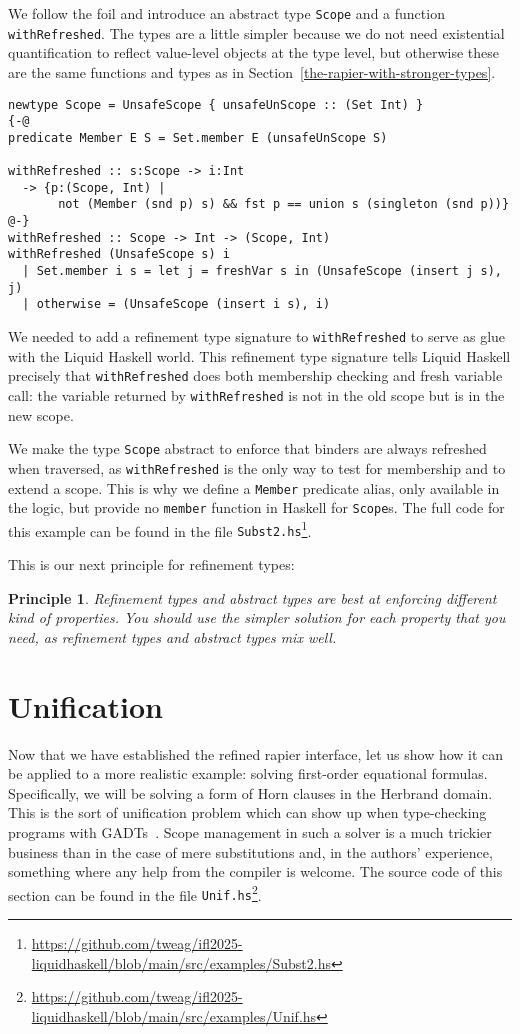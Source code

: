 \documentclass[sigconf]{acmart}
\newcommand{\tc}[1]{{\small\texttt{#1}}}
\newcommand{\sourcefile}[1]{\tc{#1}\footnote{\scriptsize\url{https://github.com/tweag/ifl2025-liquidhaskell/blob/main/src/examples/#1}}}
\newtheorem{principle}{Principle}
\begin{document}
We follow the foil and
introduce an abstract type \tc{Scope} and a function \tc{withRefreshed}. The types are a little
simpler because we do not need existential quantification to reflect value-level
objects at the type level, but otherwise these are the same functions and types
as in Section~\ref{the-rapier-with-stronger-types}.
\begin{verbatim}
newtype Scope = UnsafeScope { unsafeUnScope :: (Set Int) }
{-@
predicate Member E S = Set.member E (unsafeUnScope S)

withRefreshed :: s:Scope -> i:Int
  -> {p:(Scope, Int) |
       not (Member (snd p) s) && fst p == union s (singleton (snd p))}
@-}
withRefreshed :: Scope -> Int -> (Scope, Int)
withRefreshed (UnsafeScope s) i
  | Set.member i s = let j = freshVar s in (UnsafeScope (insert j s), j)
  | otherwise = (UnsafeScope (insert i s), i)
\end{verbatim}

We needed to add a refinement type signature to \tc{withRefreshed} to serve as
glue with the Liquid Haskell world. This refinement type signature tells Liquid
Haskell precisely that \tc{withRefreshed} does both membership checking and
fresh variable call: the variable returned by \tc{withRefreshed} is not in the
old scope but is in the new scope.

We make the type \tc{Scope} abstract to enforce that binders are always
refreshed when traversed, as \tc{withRefreshed} is the only
way to test for membership and to extend a scope. This is why we define a
\tc{Member} predicate alias, only available in the logic, but provide no
\tc{member} function in Haskell for \tc{Scope}s.
The full code for this example can be found in the
file \sourcefile{Subst2.hs}.

This is our next principle for refinement types:
\begin{principle}
  Refinement types and abstract types are best at enforcing different kind of
  properties. You should use the simpler solution for each property that you
  need, as refinement types and abstract types mix well.
\end{principle}


\section{Unification}
\label{unification}

Now that we have established the refined rapier interface, let us show how it
can be applied to a more realistic example: solving first-order equational
formulas. Specifically, we will be solving a form of Horn clauses in
the Herbrand domain. This is the sort of unification problem which can show up
when type-checking programs with GADTs~\cite{schrijvers09}. Scope management in
such a solver is a much trickier business than in the case of mere substitutions
and, in the authors' experience, something where any help from the compiler is welcome.
The source code of this section can be found in the file
\sourcefile{Unif.hs}.
\end{document}
